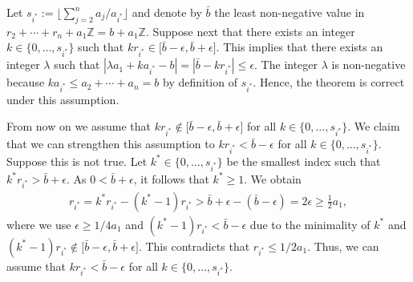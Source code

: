 \documentclass[pdflatex]{sn-jnl}
\newcommand{\Z}{\mathbb{Z}}
\theoremstyle{thmstyleone}%
\theoremstyle{thmstyletwo}%
\theoremstyle{thmstylethree}%
\begin{document}
	Let $s_{i^*} := \lfloor \sum_{j=2}^na_j/a_{i^*}\rfloor$ and denote by $\bar{b}$ the least non-negative value in $r_2 + \cdots + r_n + a_1\Z = b + a_1\Z$. Suppose next that there exists an integer $k\in \lbrace 0,\ldots,s_{i^*}\rbrace$ such that $kr_{i^*}\in \lbrack \bar{b} - \epsilon, \bar{b} + \epsilon\rbrack$. This implies that there exists an integer  $\lambda $ such that $|\lambda a_1 + k a_{i^*} - b| = |\bar{b} - kr_{i^*}|\leq \epsilon$. The integer $\lambda$ is non-negative because $k a_{i^*}\leq a_2+\cdots+ a_n = b$ by  definition of $s_{i^*}$. Hence, the theorem is correct under this assumption. 
	
	From now on we assume that $kr_{i^*}\notin \lbrack \bar{b} - \epsilon, \bar{b} + \epsilon\rbrack$ for all $k\in \lbrace 0,\ldots,s_{i^*}\rbrace$.
	We claim that we can strengthen this assumption to $kr_{i^*} < \bar{b} - \epsilon$ for all $k\in\lbrace 0,\ldots,s_{i^*}\rbrace$. Suppose this is not true. Let $k^*\in\lbrace 0,\ldots,s_{i^*}\rbrace$ be the smallest index such that $k^*r_{i^*} > \bar{b} + \epsilon$. As $0 < \bar{b} + \epsilon$, it follows that $k^*\geq 1$. We obtain
	\begin{align*}
		r_{i^*} = k^*r_{i^*} - (k^* - 1)r_{i^*} > \bar{b} + \epsilon - (\bar{b} -\epsilon) = 2\epsilon \geq \frac{1}{2} a_1,
	\end{align*}
	where we use $\epsilon\geq 1/4 a_1$ and $(k^* - 1)r_{i^*}<\bar{b}-\epsilon$ due to the minimality of $k^*$ and $(k^* - 1)r_{i^*}\notin \lbrack \bar{b} - \epsilon, \bar{b} + \epsilon\rbrack$. This contradicts that $r_{i^*} \leq 1/2 a_1$. Thus, we can assume that $kr_{i^*} < \bar{b} - \epsilon$ for all $k\in\lbrace 0,\ldots,s_{i^*}\rbrace$. 
	
\end{document}
